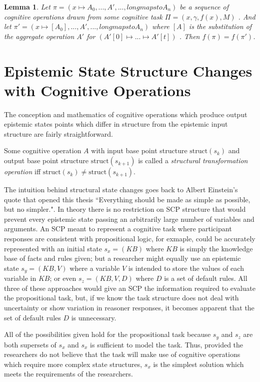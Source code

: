 \documentclass[
11pt, %
english, %
singlespacing, %
headsepline, %
]{MastersDoctoralThesis} %
\newtheorem{lemma}{Lemma}
\begin{document}
\begin{lemma} \label{lemma:substitutionValid}
Let $\pi=(x\longmapsto A_0, ..., A', ..., longmapsto A_n)$ be a sequence of cognitive operations drawn from some cognitive task $\Pi=(x, \gamma, f(x), M)$ . And let $\pi'=(x\longmapsto [A_0], ..., A', ..., longmapsto A_n)$ where $[A]$ is the substitution of the aggregate operation $A'$ for $(A'[0]\longmapsto ... \longmapsto A'[t])$ . Then $f(\pi)=f(\pi')$.
\end{lemma}

\section{Epistemic State Structure Changes with Cognitive Operations}
The conception and mathematics of cognitive operations which produce output epistemic states points which differ in structure from the epistemic input structure are fairly straightforward.

Some cognitive operation $A$ with input base point structure $\textrm{struct}(s_k)$ and output base point structure $\textrm{struct}(s_{k+1})$ is called a \textit{structural transformation operation} iff $\textrm{struct}(s_k) \ne \textrm{struct}(s_{k+1})$.

The intuition behind structural state changes goes back to Albert Einstein's quote that opened this thesis ``Everything should be made as simple as possible, but no simpler.". In theory there is no restriction on SCP structure that would prevent every epistemic state passing an arbitrarily large number of variables and arguments. An SCP meant to represent a cognitive task where participant responses are consistent with propositional logic, for exmaple, could be accurately represented with an initial state $s_x=(KB)$ where $KB$ is simply the knowledge base of facts and rules given; but a researcher might equally use an epistemic state $s_y=(KB,V)$ where a variable $V$ is intended to store the values of each variable in $KB$; or even $s_z=(KB,V,D)$ where $D$ is a set of default rules. All three of these approaches would give an SCP the information required to evaluate the propositional task, but, if we know the task structure does not deal with uncertainty or show variation in reasoner responses, it becomes apparent that the set of default rules $D$ is unnecessary.

All of the possibilities given hold for the propositional task because $s_y$ and $s_z$ are both supersets of $s_x$ and $s_x$ is sufficient to model the task. Thus, provided the researchers do not believe that the task will make use of cognitive operations which require more complex state structures, $s_x$ is the simplest solution which meets the requirements of the researchers.
\end{document}
